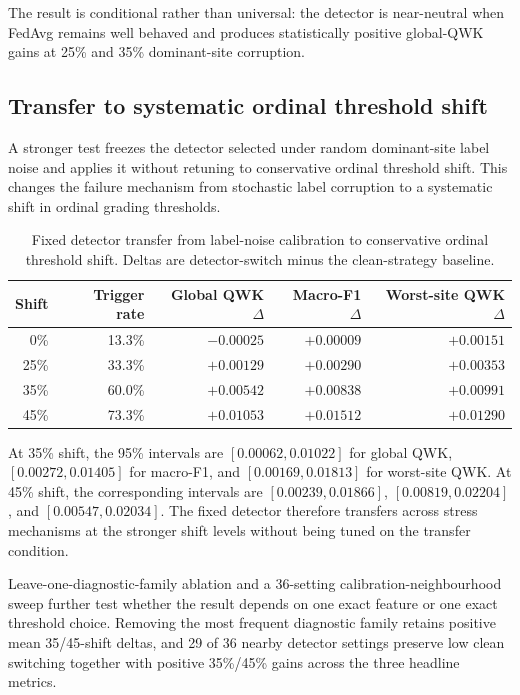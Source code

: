 The result is conditional rather than universal: the detector is near-neutral when FedAvg remains well behaved and produces statistically positive global-QWK gains at 25\% and 35\% dominant-site corruption.

\subsection{Transfer to systematic ordinal threshold shift}
A stronger test freezes the detector selected under random dominant-site label noise and applies it without retuning to conservative ordinal threshold shift. This changes the failure mechanism from stochastic label corruption to a systematic shift in ordinal grading thresholds.

\begin{table}[t]
\centering
\caption{Fixed detector transfer from label-noise calibration to conservative ordinal threshold shift. Deltas are detector-switch minus the clean-strategy baseline.}
\label{tab:panda_detector_transfer}
\small
\begin{tabular}{rrrrr}
\toprule
Shift & Trigger rate & Global QWK $\Delta$ & Macro-F1 $\Delta$ & Worst-site QWK $\Delta$ \\
\midrule
0\% & 13.3\% & $-0.00025$ & $+0.00009$ & $+0.00151$ \\
25\% & 33.3\% & $+0.00129$ & $+0.00290$ & $+0.00353$ \\
35\% & 60.0\% & $+0.00542$ & $+0.00838$ & $+0.00991$ \\
45\% & 73.3\% & $+0.01053$ & $+0.01512$ & $+0.01290$ \\
\bottomrule
\end{tabular}
\end{table}

At 35\% shift, the 95\% intervals are $[0.00062,0.01022]$ for global QWK, $[0.00272,0.01405]$ for macro-F1, and $[0.00169,0.01813]$ for worst-site QWK. At 45\% shift, the corresponding intervals are $[0.00239,0.01866]$, $[0.00819,0.02204]$, and $[0.00547,0.02034]$. The fixed detector therefore transfers across stress mechanisms at the stronger shift levels without being tuned on the transfer condition.

Leave-one-diagnostic-family ablation and a 36-setting calibration-neighbourhood sweep further test whether the result depends on one exact feature or one exact threshold choice. Removing the most frequent diagnostic family retains positive mean 35/45-shift deltas, and 29 of 36 nearby detector settings preserve low clean switching together with positive 35\%/45\% gains across the three headline metrics.

